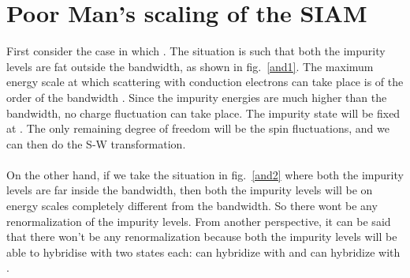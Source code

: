 \documentclass[12pt,twoside]{report}
\numberwithin{equation}{section}
\begin{document}
\section{Poor Man's scaling of the SIAM}
First consider the case in which .
The situation is such that both the impurity levels are fat outside the bandwidth, as shown in fig.~\ref{and1}.
The maximum energy scale at which scattering with conduction electrons can take place is of the order of the bandwidth .
Since the impurity energies are much higher than the bandwidth, no charge fluctuation can take place.
The impurity state will be fixed at .
The only remaining degree of freedom will be the spin fluctuations, and we can then do the S-W transformation.\\\\
On the other hand, if we take the situation in fig.~\ref{and2} where both the impurity levels are far inside the bandwidth, then both the impurity levels will be on energy scales completely different from the bandwidth.
So there wont be any renormalization of the impurity levels.
From another perspective, it can be said that there won't be any renormalization because both the impurity levels  will be able to hybridise with two states each:  can hybridize with  and \il{\ket{1\sigma}} can hybridize with .
\end{document}
